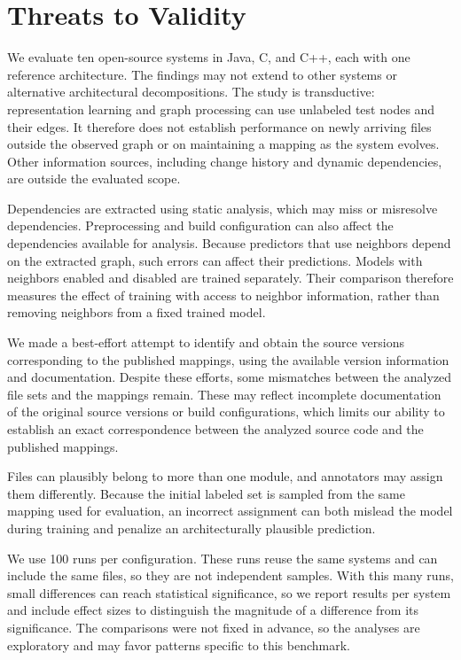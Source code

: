 \section{Threats to Validity\label{sec:threats}}

 We evaluate ten open-source systems in Java, C, and C++, each with one reference architecture. The findings may not extend to other systems or alternative architectural decompositions. The study is transductive: representation learning and graph processing can use unlabeled test nodes and their edges. It therefore does not establish performance on newly arriving files outside the observed graph or on maintaining a mapping as the system evolves. Other information sources, including change history and dynamic dependencies, are outside the evaluated scope.

 Dependencies are extracted using static analysis, which may miss or misresolve dependencies. Preprocessing and build configuration can also affect the dependencies available for analysis. Because predictors that use neighbors depend on the extracted graph, such errors can affect their predictions. Models with neighbors enabled and disabled are trained separately. Their comparison therefore measures the effect of training with access to neighbor information, rather than removing neighbors from a fixed trained model.

We made a best-effort attempt to identify and obtain the source versions corresponding to the published mappings, using the available version information and documentation. Despite these efforts, some mismatches between the analyzed file sets and the mappings remain. These may reflect incomplete documentation of the original source versions or build configurations, which limits our ability to establish an exact correspondence between the analyzed source code and the published mappings.

Files can plausibly belong to more than one module, and annotators may assign them differently. Because the initial labeled set is sampled from the same mapping used for evaluation, an incorrect assignment can both mislead the model during training and penalize an architecturally plausible prediction.

 We use 100 runs per configuration. These runs reuse the same systems and can include the same files, so they are not independent samples. With this many runs, small differences can reach statistical significance, so we report results per system and include effect sizes to distinguish the magnitude of a difference from its significance. The comparisons were not fixed in advance, so the analyses are exploratory and may favor patterns specific to this benchmark.

